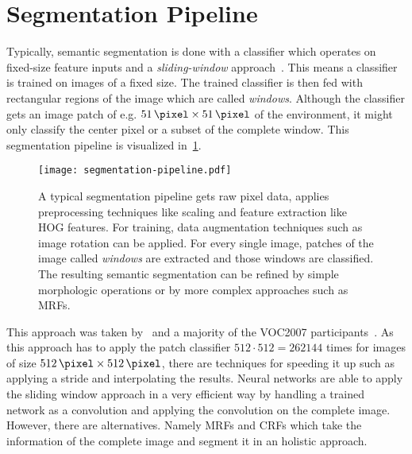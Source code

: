 \documentclass[technote,a4paper,leqno]{IEEEtran}
\begin{document}
\section{Segmentation Pipeline}
Typically, semantic segmentation is done with a classifier which operates on
fixed-size feature inputs and a \textit{sliding-window}
approach~\cite{1467360,5490399,schroff2008object}. This means a classifier is
trained on images of a fixed size. The trained classifier is then fed with
rectangular regions of the image which are called \textit{windows}. Although
the classifier gets an image patch of e.g. $\SI{51}{\pixel} \times
\SI{51}{\pixel}$ of the environment, it might only classify the center pixel or
a subset of the complete window. This
segmentation pipeline is visualized in~\cref{fig:segmentation-pipeline}.
\begin{figure}
    \centering
    \texttt{[image: segmentation-pipeline.pdf]}
    \caption{A typical segmentation pipeline gets raw pixel data, applies
             preprocessing techniques like scaling and feature extraction like
             HOG features. For training, data augmentation techniques such as
             image rotation can be applied. For every single image, patches
             of the image called \textit{windows} are extracted and those
             windows are classified. The resulting semantic segmentation can
             be refined by simple morphologic operations or by more complex
             approaches such as \glspl{MRF}.}
    \label{fig:segmentation-pipeline}
\end{figure}
This approach was taken by~\cite{bittel2015pixel} and a majority of the VOC2007
participants~\cite{pascal-voc-2007}. As this approach has to apply the patch
classifier $512 \cdot 512 = \num{262144}$ times for images of size
$\SI{512}{\pixel} \times \SI{512}{\pixel}$, there are techniques for speeding
it up such as applying a stride and interpolating the results.
Neural networks are able to apply the sliding window approach in a very
efficient way by handling a trained network as a convolution and applying the
convolution on the complete image.
However, there are alternatives. Namely \glspl{MRF} and \glspl{CRF}
which take the information of the complete image and segment it in an holistic
approach.
\end{document}
